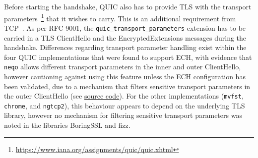 Before starting the handshake, QUIC also has to provide TLS with the transport parameters~\footnote{\url{https://www.iana.org/assignments/quic/quic.xhtml}} that it wishes to carry. This is an additional requirement from TCP~\cite{rfc9000}. As per RFC 9001, the \texttt{quic\_transport\_parameters} extension has to be carried in a TLS ClientHello and the EncryptedExtensions messages during the handshake. 
Differences regarding transport parameter handling exist within the four QUIC implementations that were found to support ECH, with evidence that \texttt{neqo} allows different transport parameters in the inner and outer ClientHello, however cautioning against using this feature unless the ECH configuration has been validated, due to a mechanism that filters sensitive transport parameters in the outer ClientHello (see \href{https://github.com/mozilla/neqo/blob/main/neqo-crypto/src/agent.rs#L1176-L1182}{source code}).
For the other implementations (\texttt{mvfst}, \texttt{chrome}, and \texttt{ngtcp2}), this behaviour appears to depend on the underlying TLS library, however no mechanism for filtering sensitive transport parameters was noted in the libraries BoringSSL and fizz.

